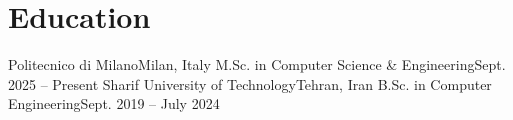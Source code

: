 \section{Education}
\resumeSubHeadingListStart
  \resumeSubheading
    {Politecnico di Milano}{Milan, Italy}
    {M.Sc. in Computer Science \& Engineering}{Sept. 2025 -- Present}
    \resumeItemListStart
    \resumeItemListEnd
  \resumeSubheading
    {Sharif University of Technology}{Tehran, Iran}
    {B.Sc. in Computer Engineering}{Sept. 2019 -- July 2024}
    \resumeItemListStart
    \resumeItemListEnd
\resumeSubHeadingListEnd
